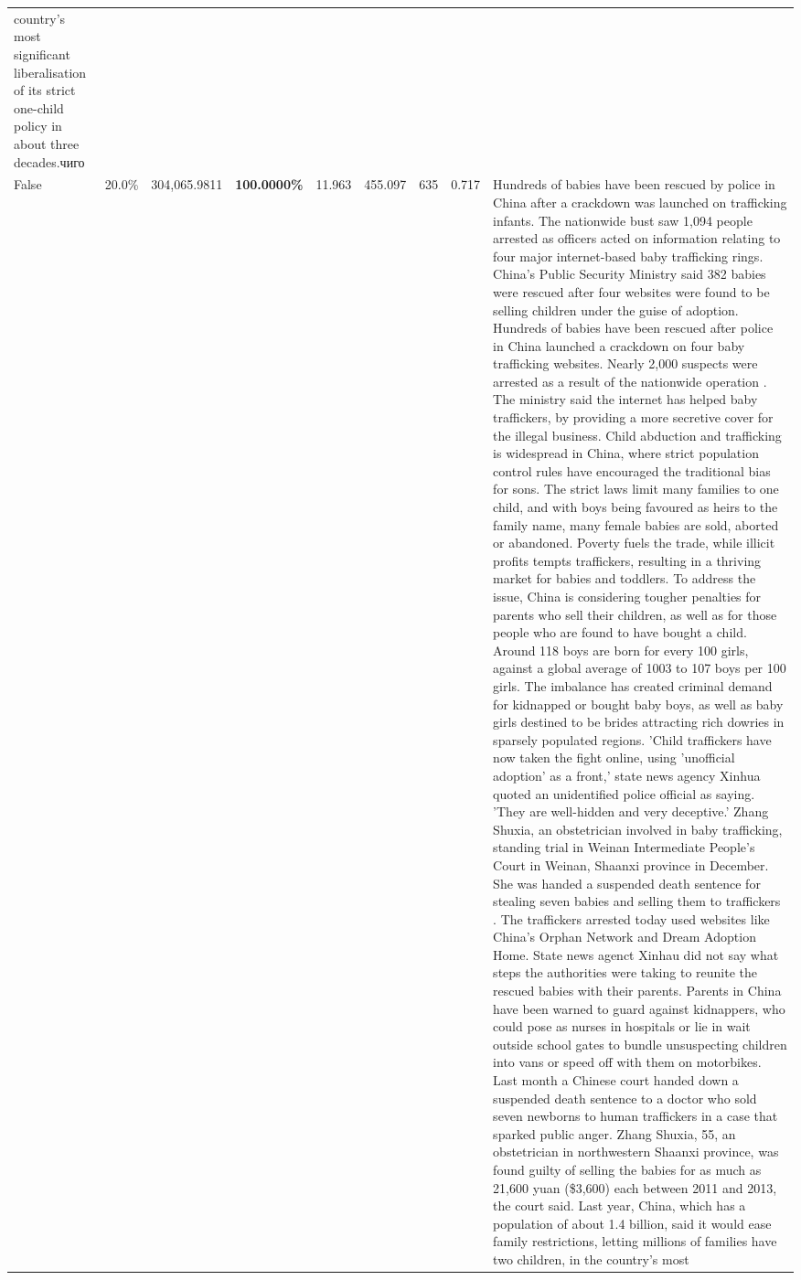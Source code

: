 \begin{table}[H]
\begin{tabular}{lllrlllll}
country's most significant liberalisation of its strict one-child policy in about three decades.чиго \\
\cline{1-9}
False & 20.0\% & 304,065.9811 & \bfseries \color{red} 100.0000\% & 11.963 & 455.097 & 635 & 0.717 & Hundreds of babies have been rescued by police in China after a crackdown was launched on trafficking infants. The nationwide bust saw 1,094 people arrested as officers acted on information relating to four major internet-based baby trafficking rings. China's Public Security Ministry said 382 babies were rescued after four websites were found to be selling children under the guise of adoption. Hundreds of babies have been rescued after police in China launched a crackdown on four baby trafficking websites. Nearly 2,000 suspects were arrested as a result of the nationwide operation . The ministry said the internet has helped baby traffickers, by providing a more secretive cover for the illegal business. Child abduction and trafficking is widespread in China, where strict population control rules have encouraged the traditional bias for sons. The strict laws limit many families to one child, and with boys being favoured as heirs to the family name, many female babies are sold, aborted or abandoned. Poverty fuels the trade, while illicit profits tempts traffickers, resulting in a thriving market for babies and toddlers. To address the issue, China is considering tougher penalties for parents who sell their children, as well as for those people who are found to have bought a child. Around 118 boys are born for every 100 girls, against a global average of 1003 to 107 boys per 100 girls. The imbalance has created criminal demand for kidnapped or bought baby boys, as well as baby girls destined to be brides attracting rich dowries in sparsely populated regions. 'Child traffickers have now taken the fight online, using 'unofficial adoption' as a front,' state news agency Xinhua quoted an unidentified police official as saying. 'They are well-hidden and very deceptive.' Zhang Shuxia, an obstetrician involved in baby trafficking, standing trial in Weinan Intermediate People's Court in Weinan, Shaanxi province in December. She was handed a suspended death sentence for stealing seven babies and selling them to traffickers . The traffickers arrested today used websites like China's Orphan Network and Dream Adoption Home. State news agenct Xinhau did not say what steps the authorities were taking to reunite the rescued babies with their parents. Parents in China have been warned to guard against kidnappers, who could pose as nurses in hospitals or lie in wait outside school gates to bundle unsuspecting children into vans or speed off with them on motorbikes. Last month a Chinese court handed down a suspended death sentence to a doctor who sold seven newborns to human traffickers in a case that sparked public anger. Zhang Shuxia, 55, an obstetrician in northwestern Shaanxi province, was found guilty of selling the babies for as much as 21,600 yuan (\$3,600) each between 2011 and 2013, the court said. Last year, China, which has a population of about 1.4 billion, said it would ease family restrictions, letting millions of families have two children, in the country's most 
\end{tabular}
\end{table}
